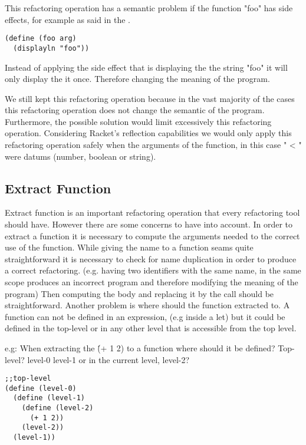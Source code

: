 This refactoring operation has a semantic problem if the function "foo" has
side effects, for example as said in the .
\begin{lstlisting}[basicstyle=\ttfamily, caption="Foo"]
(define (foo arg)
  (displayln "foo"))
\end{lstlisting}

Instead of applying the side effect that is displaying the the string "foo"
 it will only display the it once. Therefore changing the meaning of the program.

We still kept this refactoring operation because in the vast majority
of the cases this refactoring operation does not change the semantic of the program.
Furthermore, the possible solution would limit excessively this refactoring operation.  %
Considering Racket's reflection capabilities we would only apply this refactoring operation
safely when the arguments of the function, in this case " < " were datums (number, boolean or string). %

\subsection{Extract Function}
Extract function is an important refactoring operation that every refactoring tool
should have.
However there are some concerns to have into account.
In order to extract a function it is necessary to compute the arguments needed
to the correct use of the function.
While giving the name to a function seams quite straightforward it is necessary to
check for name duplication in order to produce a correct refactoring. (e.g. having
two identifiers with the same name, in the same scope produces an incorrect program
and therefore modifying the meaning of the program)
Then computing the body and replacing it by the call should be straightforward.
Another problem is where should the function extracted to. A function can not
be defined in an expression, (e.g inside a let) but it could be defined in the top-level
or in any other level that is accessible from the top level.

e.g: When extracting the \'(+ 1 2) to a function where should it be defined?
Top-level? level-0 level-1 or in the current level, level-2?
\begin{lstlisting}[basicstyle=\ttfamily, caption="Example"]
;;top-level
(define (level-0)
  (define (level-1)
    (define (level-2)
      (+ 1 2))
    (level-2))
  (level-1))
\end{lstlisting}

